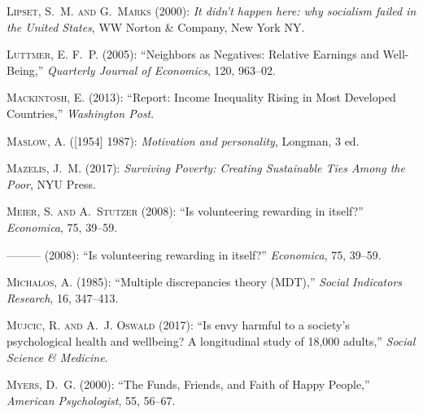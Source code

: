 \textsc{Lipset, S.~M. and G.~Marks} (2000): \emph{It didn't happen here: why
  socialism failed in the United States}, WW Norton \& Company, New York NY.

\textsc{Luttmer, E. F.~P.} (2005): \enquote{Neighbors as Negatives: Relative
  Earnings and Well-Being,} \emph{Quarterly Journal of Economics}, 120,
  963--02.

\textsc{Mackintosh, E.} (2013): \enquote{Report: Income Inequality Rising in
  Most Developed Countries,} \emph{Washington Post}.

\textsc{Maslow, A.} ([1954] 1987): \emph{{Motivation and personality}},
  Longman, 3 ed.

\textsc{Mazelis, J.~M.} (2017): \emph{Surviving Poverty: Creating Sustainable
  Ties Among the Poor}, NYU Press.

\textsc{Meier, S. and A.~Stutzer} (2008{}): \enquote{Is
  volunteering rewarding in itself?} \emph{Economica}, 75, 39--59.

---\hspace{-.1pt}---\hspace{-.1pt}--- (2008{}): \enquote{Is volunteering rewarding in itself?} \emph{Economica}, 75, 39--59.

\textsc{Michalos, A.} (1985): \enquote{Multiple discrepancies theory (MDT),}
  \emph{Social Indicators Research}, 16, 347--413.

\textsc{Mujcic, R. and A.~J. Oswald} (2017): \enquote{Is envy harmful to a
  society's psychological health and wellbeing? A longitudinal study of 18,000
  adults,} \emph{Social Science \& Medicine}.

\textsc{Myers, D.~G.} (2000): \enquote{The Funds, Friends, and Faith of Happy
  People,} \emph{American Psychologist}, 55, 56--67.

